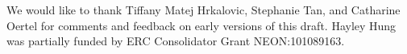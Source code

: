 \documentclass[sigconf]{acmart}
\begin{document}
\begin{acks}
We would like to thank Tiffany Matej Hrkalovic, Stephanie Tan, and Catharine Oertel for comments and feedback on early versions of this draft. 
Hayley Hung was partially funded by ERC Consolidator Grant NEON:101089163.  
\end{acks}







\end{document}
